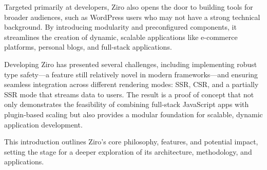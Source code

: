 Targeted primarily at developers, Ziro also opens the door to building tools for broader audiences, such as WordPress users who may not have a strong technical background. By introducing modularity and preconfigured components, it streamlines the creation of dynamic, scalable applications like e-commerce platforms, personal blogs, and full-stack applications.

Developing Ziro has presented several challenges, including implementing robust type safety—a feature still relatively novel in modern frameworks—and ensuring seamless integration across different rendering modes: SSR, CSR, and a partially SSR mode that streams data to users. The result is a proof of concept that not only demonstrates the feasibility of combining full-stack JavaScript apps with plugin-based scaling but also provides a modular foundation for scalable, dynamic application development.

This introduction outlines Ziro’s core philosophy, features, and potential impact, setting the stage for a deeper exploration of its architecture, methodology, and applications.

\pagebreak
